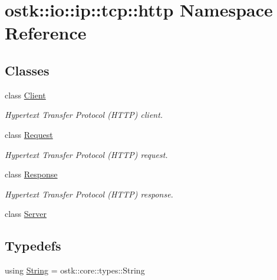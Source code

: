 \hypertarget{namespaceostk_1_1io_1_1ip_1_1tcp_1_1http}{}\section{ostk\+:\+:io\+:\+:ip\+:\+:tcp\+:\+:http Namespace Reference}
\label{namespaceostk_1_1io_1_1ip_1_1tcp_1_1http}
\subsection*{Classes}
\begin{DoxyCompactItemize}
\item 
class \hyperlink{classostk_1_1io_1_1ip_1_1tcp_1_1http_1_1_client}{Client}
\begin{DoxyCompactList}\small\item\em Hypertext Transfer Protocol (H\+T\+TP) client. \end{DoxyCompactList}\item 
class \hyperlink{classostk_1_1io_1_1ip_1_1tcp_1_1http_1_1_request}{Request}
\begin{DoxyCompactList}\small\item\em Hypertext Transfer Protocol (H\+T\+TP) request. \end{DoxyCompactList}\item 
class \hyperlink{classostk_1_1io_1_1ip_1_1tcp_1_1http_1_1_response}{Response}
\begin{DoxyCompactList}\small\item\em Hypertext Transfer Protocol (H\+T\+TP) response. \end{DoxyCompactList}\item 
class \hyperlink{classostk_1_1io_1_1ip_1_1tcp_1_1http_1_1_server}{Server}
\end{DoxyCompactItemize}
\subsection*{Typedefs}
\begin{DoxyCompactItemize}
\item 
using \hyperlink{namespaceostk_1_1io_1_1ip_1_1tcp_1_1http_a88a1b82fb01d02df64ca01ef4058bbef}{String} = ostk\+::core\+::types\+::\+String
\end{DoxyCompactItemize}
